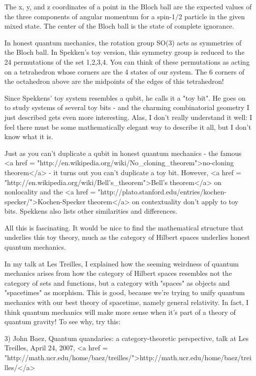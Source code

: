 The x, y, and z coordinates of a point in the Bloch ball are the 
expected values of the three components of angular momentum for a 
spin-1/2 particle in the given mixed state.  The center of the Bloch 
ball is the state of complete ignorance.

In honest quantum mechanics, the rotation group SO(3) acts as symmetries 
of the Bloch ball.  In Spekken's toy version, this symmetry group is 
reduced to the 24 permutations of the set {1,2,3,4}.  You can think 
of these permutations as acting on a tetrahedron whose corners are the
4 states of our system.  The 6 corners of the octahedron above are the
midpoints of the edges of this tetrahedron!

Since Spekkens' toy system resembles a qubit, he calls it a "toy
bit".  He goes on to study systems of several toy bits - and the
charming combinatorial geometry I just described gets even more
interesting.  Alas, I don't really understand it well: I feel there
must be some mathematically elegant way to describe it all, but I
don't know what it is.

Just as you can't duplicate a qubit in honest quantum mechanics - the
famous <a href = "http://en.wikipedia.org/wiki/No_cloning_theorem">no-cloning 
theorem</a> - it turns out you can't
duplicate a toy bit.  However, <a href = "http://en.wikipedia.org/wiki/Bell's_theorem">Bell's theorem</a> on nonlocality and the
<a href = "http://plato.stanford.edu/entries/kochen-specker/">Kochen-Specker 
theorem</a> on contextuality don't apply to toy bits.
Spekkens also lists other similarities and differences.

All this is fascinating.  It would be nice to find the mathematical
structure that underlies this toy theory, much as the category of 
Hilbert spaces underlies honest quantum mechanics.  

In my talk at Les Treilles, I explained how the seeming weirdness of
quantum mechanics arises from how the category of Hilbert spaces
resembles not the category of sets and functions, but a category with
"spaces" as objects and "spacetimes" as morphism.
This is good, because we're trying to unify quantum mechanics with our
best theory of spacetime, namely general relativity.  In fact, I think
quantum mechanics will make more sense when it's part of a theory of
quantum gravity!  To see why, try this:

3) John Baez, Quantum quandaries: a category-theoretic perspective,
talk at Les Treilles, April 24, 2007, <a href = "http://math.ucr.edu/home/baez/treilles/">http://math.ucr.edu/home/baez/treilles/</a>

